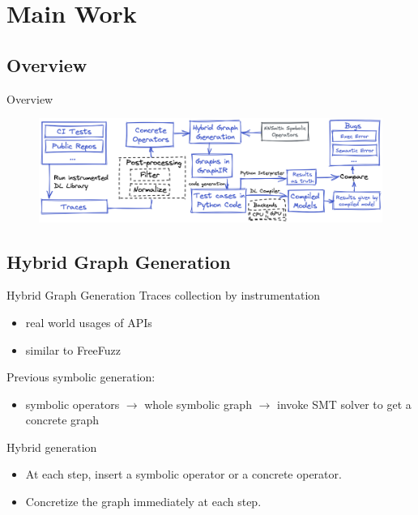 \documentclass{beamer}
\begin{document}
\section{Main Work}

\subsection{Overview}
\begin{frame}{Overview}
    \begin{figure}
        \centering
        \includegraphics[scale=0.225]{figs/overview.png}
        \label{fig:overview}
    \end{figure}
\end{frame}

\subsection{Hybrid Graph Generation}
\begin{frame}{Hybrid Graph Generation}
    Traces collection by instrumentation
    \begin{itemize}
        \item real world usages of APIs
        \item similar to FreeFuzz
    \end{itemize}
    Previous symbolic generation:
    \begin{itemize}
        \item symbolic operators $\rightarrow$ whole symbolic graph $\rightarrow$ invoke SMT solver to get a concrete graph
    \end{itemize}
    Hybrid generation
    \begin{itemize}
        \item At each step, insert a symbolic operator or a concrete operator.
        \item Concretize the graph immediately at each step.
    \end{itemize}
\end{frame}
\end{document}
